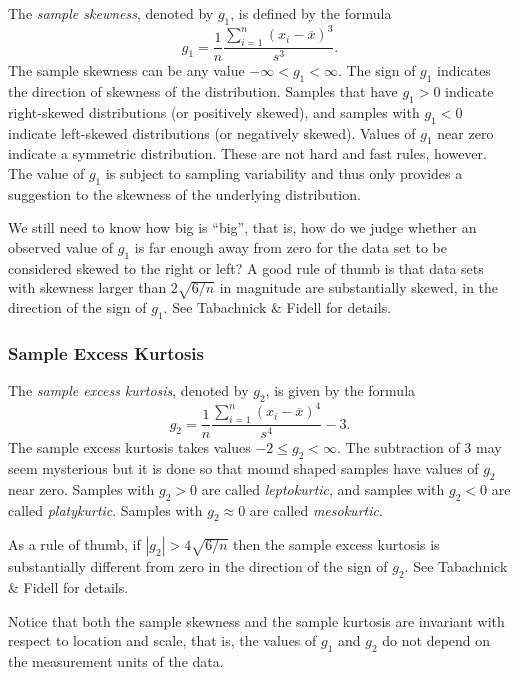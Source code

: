 \documentclass[captions=tableheading]{scrbook}
\begin{document}
The \emph{sample skewness}, denoted by \(g_{1}\), is defined by the formula
\begin{equation}
g_{1}=\frac{1}{n}\frac{\sum_{i=1}^{n}(x_{i}-\overline{x})^{3}}{s^{3}}.
\end{equation}
The sample skewness can be any value \(-\infty<g_{1}<\infty\). The sign of \(g_{1}\) indicates the direction of skewness of the distribution. Samples that have \(g_{1}>0\) indicate right-skewed distributions (or positively skewed), and samples with \(g_{1}<0\) indicate left-skewed distributions (or negatively skewed). Values of \(g_{1}\) near zero indicate a symmetric distribution. These are not hard and fast rules, however. The value of \(g_{1}\) is subject to sampling variability and thus only provides a suggestion to the skewness of the underlying distribution. 

We still need to know how big is ``big'', that is, how do we judge whether an observed value of \(g_{1}\) is far enough away from zero for the data set to be considered skewed to the right or left? A good rule of thumb is that data sets with skewness larger than \(2\sqrt{6/n}\) in magnitude are substantially skewed, in the direction of the sign of \(g_{1}\). See Tabachnick \& Fidell \cite{Tabachnick2006} for details.
\subsubsection{Sample Excess Kurtosis}
\label{sec-2-3-5-2}


The \emph{sample excess kurtosis}, denoted by \(g_{2}\), is given by the formula
\begin{equation}
g_{2}=\frac{1}{n}\frac{\sum_{i=1}^{n}(x_{i}-\overline{x})^{4}}{s^{4}}-3.
\end{equation}
The sample excess kurtosis takes values \(-2\leq g_{2}<\infty\). The subtraction of 3 may seem mysterious but it is done so that mound shaped samples have values of \(g_{2}\) near zero. Samples with \(g_{2}>0\) are called \emph{leptokurtic}, and samples with \(g_{2}<0\) are called \emph{platykurtic}. Samples with \(g_{2}\approx0\) are called \emph{mesokurtic}.

As a rule of thumb, if \(|g_{2}|>4\sqrt{6/n}\) then the sample excess kurtosis is substantially different from zero in the direction of the sign of \(g_{2}\). See Tabachnick \& Fidell \cite{Tabachnick2006} for details.

Notice that both the sample skewness and the sample kurtosis are invariant with respect to location and scale, that is, the values of \(g_{1}\) and \(g_{2}\) do not depend on the measurement units of the data. 
\end{document}
